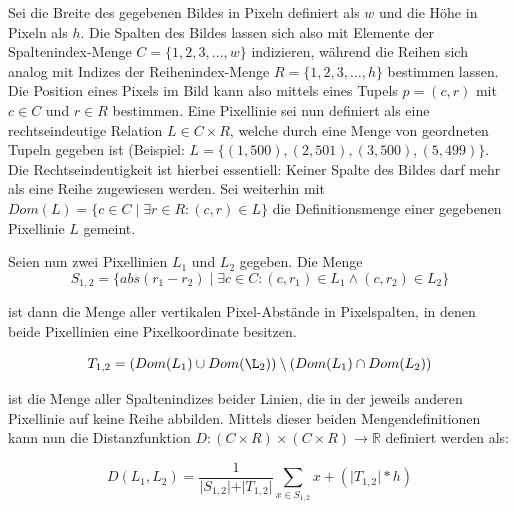 Sei die Breite des gegebenen Bildes in Pixeln definiert als \(w\) und die Höhe in Pixeln als \(h\). Die Spalten des Bildes  lassen sich also mit Elemente der Spaltenindex-Menge \(C = \lbrace 1, 2, 3, \ldots , w \rbrace\) indizieren, während  die Reihen sich analog mit Indizes der Reihenindex-Menge \(R = \lbrace 1, 2, 3, \ldots , h \rbrace\) bestimmen lassen. Die Position eines Pixels im Bild kann also mittels eines Tupels \(p = (c, r)\) mit \(c \in C\) und \(r \in R\) bestimmen. Eine Pixellinie sei nun definiert als eine rechtseindeutige Relation \(L \in C \times R\), welche durch eine Menge von geordneten Tupeln gegeben ist (Beispiel: \(L = \lbrace (1, 500), (2,501), (3, 500), (5, 499) \rbrace\).
Die Rechtseindeutigkeit ist hierbei essentiell: Keiner Spalte des Bildes darf mehr als eine Reihe zugewiesen werden. Sei weiterhin mit \(Dom(L) = \lbrace c \in C \mid \exists r \in R: (c,r) \in L \rbrace\) die Definitionsmenge einer gegebenen Pixellinie \(L\) gemeint.\newline

Seien nun zwei Pixellinien \(L_{1}\) und \(L_{2}\) gegeben. Die Menge
\begin{equation}
\label{equ:DefS}
S_{1,2} = \lbrace abs(r_{1} - r_{2}) \mid \exists c \in C: (c, r_{1}) \in L_{1} \wedge (c, r_{2}) \in L_{2} \rbrace
\end{equation}

ist dann die Menge aller vertikalen Pixel-Abstände in Pixelspalten, in denen beide Pixellinien eine Pixelkoordinate besitzen. 

\begin{equation}
\label{equ:DefT}
T_{1,2} = (Dom(L_{1}) \cup Dom(\L_{2})) \setminus (Dom(L_{1}) \cap Dom(L_{2}))   
\end{equation}   

ist die Menge aller Spaltenindizes beider Linien, die in der jeweils anderen Pixellinie auf keine Reihe abbilden. Mittels dieser beiden Mengendefinitionen kann nun die Distanzfunktion \(D: (C \times R) \times (C \times R) \rightarrow \mathbb{R}\) definiert werden als:

\begin{equation}
\label{equ:distance}
D(L_{1}, L_{2}) = \frac{1}{\vert S_{1,2} \vert + \vert T_{1,2} \vert} \sum_{x \in S_{1, 2}}^{}x + ( \vert T_{1,2} \vert * h )
\end{equation}

